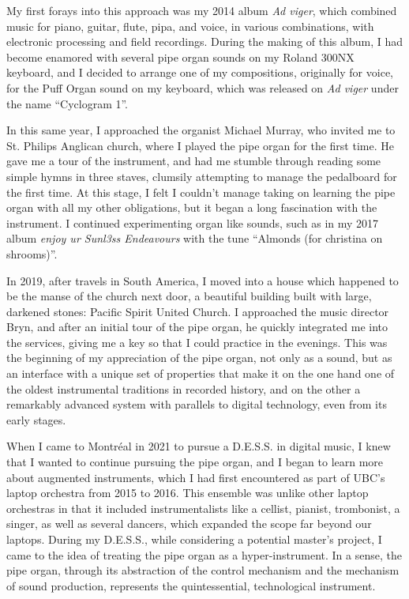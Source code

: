 \documentclass[12pt,twoside,maitrise]{dms_ks}
\theoremstyle{definition}
\begin{document}
My first forays into this approach was my 2014 album \textit{Ad viger}, which combined music for piano, guitar, flute, pipa, and voice, in various combinations, with electronic processing and field recordings. 
During the making of this album, I had become enamored with several pipe organ sounds on my Roland 300NX keyboard, and I decided to arrange one of my compositions, originally for voice, for the Puff Organ sound on my keyboard, which was released on \textit{Ad viger} under the name “Cyclogram 1”.

In this same year, I approached the organist Michael Murray, who invited me to St. 
Philips Anglican church, where I played the pipe organ for the first time. 
He gave me a tour of the instrument, and had me stumble through reading some simple hymns in three staves, clumsily attempting to manage the pedalboard for the first time. 
At this stage, I felt I couldn't manage taking on learning the pipe organ with all my other obligations, but it began a long fascination with the instrument. 
I continued experimenting organ like sounds, such as in my 2017 album \textit{enjoy ur Sunl3ss Endeavours} with the tune “Almonds (for christina on shrooms)”. 

In 2019, after travels in South America, I moved into a house which happened to be the manse of the church next door, a beautiful building built with large, darkened stones: Pacific Spirit United Church. 
I approached the music director Bryn, and after an initial tour of the pipe organ, he quickly integrated me into the services, giving me a key so that I could practice in the evenings. 
This was the beginning of my appreciation of the pipe organ, not only as a sound, but as an interface with a unique set of properties that make it on the one hand one of the oldest instrumental traditions in recorded history, and on the other a remarkably advanced system with parallels to digital technology, even from its early stages.

When I came to Montréal in 2021 to pursue a D.E.S.S. in digital music, I knew that I wanted to continue pursuing the pipe organ, and I began to learn more about augmented instruments, which I had first encountered as part of UBC's laptop orchestra from 2015 to 2016. 
This ensemble was unlike other laptop orchestras in that it included instrumentalists like a cellist, pianist, trombonist, a singer, as well as several dancers, which expanded the scope far beyond our laptops. 
During my D.E.S.S., while considering a potential master's project, I came to the idea of treating the pipe organ as a hyper-instrument. 
In a sense, the pipe organ, through its abstraction of the control mechanism and the mechanism of sound production, represents the quintessential, technological instrument.
 
\end{document}

